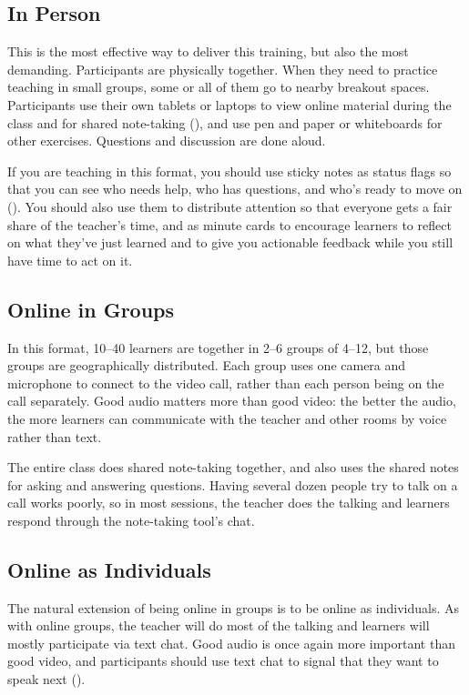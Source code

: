 \subsection*{In Person}

This is the most effective way to deliver this training,
but also the most demanding.
Participants are physically together.
When they need to practice teaching in small groups,
some or all of them go to nearby breakout spaces.
Participants use their own tablets or laptops to view online material during the class
and for shared note-taking (),
and use pen and paper or whiteboards for other exercises.
Questions and discussion are done aloud.

If you are teaching in this format,
you should use sticky notes as status flags
so that you can see who needs help,
who has questions,
and who's ready to move on ().
You should also use them to distribute attention
so that everyone gets a fair share of the teacher's time,
and as minute cards to encourage learners to reflect on what they've just learned
and to give you actionable feedback while you still have time to act on it.

\subsection*{Online in Groups}

In this format,
10--40 learners are together in 2--6 groups of 4--12,
but those groups are geographically distributed.
Each group uses one camera and microphone to connect to the video call,
rather than each person being on the call separately.
Good audio matters more than good video:
the better the audio,
the more learners can communicate with the teacher and other rooms by voice rather than text.

The entire class does shared note-taking together,
and also uses the shared notes for asking and answering questions.
Having several dozen people try to talk on a call works poorly,
so in most sessions,
the teacher does the talking and learners respond through the note-taking tool's chat.

\subsection*{Online as Individuals}

The natural extension of being online in groups is to be online as individuals.
As with online groups,
the teacher will do most of the talking and learners will mostly participate via text chat.
Good audio is once again more important than good video,
and participants should use text chat to signal that they want to speak next ().

